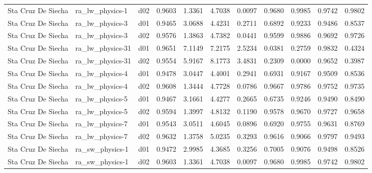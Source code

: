 \begin{longtable}{lllrrrrrrrr}
   Sta Cruz De Siecha  &       ra\_lw\_physics-1 &     d02 &   0.9603 &   1.3361 &   4.7038 &       0.0097 &        0.9680 &       0.9985 &           0.9742 &  0.9802 \\
   Sta Cruz De Siecha  &       ra\_lw\_physics-3 &     d01 &   0.9465 &   3.0688 &   4.4231 &       0.2711 &        0.6892 &       0.9233 &           0.9486 &  0.8537 \\
   Sta Cruz De Siecha  &       ra\_lw\_physics-3 &     d02 &   0.9576 &   1.3863 &   4.7382 &       0.0441 &        0.9599 &       0.9886 &           0.9692 &  0.9726 \\
   Sta Cruz De Siecha  &      ra\_lw\_physics-31 &     d01 &   0.9651 &   7.1149 &   7.2175 &       2.5234 &        0.0381 &       0.2759 &           0.9832 &  0.4324 \\
   Sta Cruz De Siecha  &      ra\_lw\_physics-31 &     d02 &   0.9554 &   5.9167 &   8.1773 &       3.4831 &        0.2309 &       0.0000 &           0.9652 &  0.3987 \\
   Sta Cruz De Siecha  &       ra\_lw\_physics-4 &     d01 &   0.9478 &   3.0447 &   4.4001 &       0.2941 &        0.6931 &       0.9167 &           0.9509 &  0.8536 \\
   Sta Cruz De Siecha  &       ra\_lw\_physics-4 &     d02 &   0.9608 &   1.3444 &   4.7728 &       0.0786 &        0.9667 &       0.9786 &           0.9752 &  0.9735 \\
   Sta Cruz De Siecha  &       ra\_lw\_physics-5 &     d01 &   0.9467 &   3.1661 &   4.4277 &       0.2665 &        0.6735 &       0.9246 &           0.9490 &  0.8490 \\
   Sta Cruz De Siecha  &       ra\_lw\_physics-5 &     d02 &   0.9594 &   1.3997 &   4.8132 &       0.1190 &        0.9578 &       0.9670 &           0.9727 &  0.9658 \\
   Sta Cruz De Siecha  &       ra\_lw\_physics-7 &     d01 &   0.9543 &   3.0511 &   4.6045 &       0.0896 &        0.6920 &       0.9755 &           0.9631 &  0.8769 \\
   Sta Cruz De Siecha  &       ra\_lw\_physics-7 &     d02 &   0.9632 &   1.3758 &   5.0235 &       0.3293 &        0.9616 &       0.9066 &           0.9797 &  0.9493 \\
   Sta Cruz De Siecha  &       ra\_sw\_physics-1 &     d01 &   0.9472 &   2.9985 &   4.3685 &       0.3256 &        0.7005 &       0.9076 &           0.9498 &  0.8526 \\
   Sta Cruz De Siecha  &       ra\_sw\_physics-1 &     d02 &   0.9603 &   1.3361 &   4.7038 &       0.0097 &        0.9680 &       0.9985 &           0.9742 &  0.9802 \\

\end{longtable}
